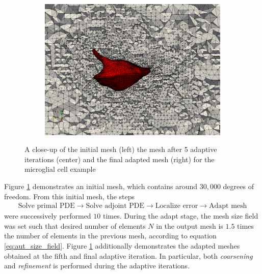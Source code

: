 \begin{figure}[ht!]
\begin{subfigure}{0.33\textwidth}
\includegraphics[width=.99\linewidth]{img/aut_glial_mesh10.png}
\end{subfigure}
\caption{A close-up of the initial mesh (left) the mesh after
5 adaptive iterations (center) and the final adapted mesh (right)
for the microglial cell example}
\label{fig:aut_glial_meshes}
\end{figure}

Figure \ref{fig:aut_glial_meshes} demonstrates an initial mesh,
which contains around $30,000$ degrees of freedom. From this initial
mesh, the steps
%
\begin{gather*}
\text{Solve primal PDE} \rightarrow
\text{Solve adjoint PDE} \rightarrow
\text{Localize error} \rightarrow
\text{Adapt mesh}
\end{gather*}
%
were successively performed $10$ times. During the adapt stage,
the mesh size field was set such that desired number of elements
$N$ in the output mesh is $1.5$ times the number of elements
in the previous mesh, according to equation \eqref{eq:aut_size_field}.
Figure \ref{fig:aut_glial_meshes} additionally demonstrates the adapted
meshes obtained at the fifth and final adaptive iteration.
In particular, both \emph{coarsening} and \emph{refinement} is performed
during the adaptive iterations.

